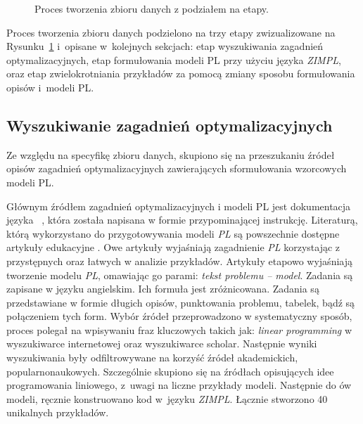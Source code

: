 \begin{figure}
\caption{Proces tworzenia zbioru danych z podziałem na etapy.}
\label{fig:dataset-creation-logical}
\end{figure}

Proces tworzenia zbioru danych podzielono na trzy etapy zwizualizowane na Rysunku~\ref{fig:dataset-creation-logical} i~opisane w~kolejnych sekcjach: etap wyszukiwania zagadnień optymalizacyjnych, etap formułowania modeli PL przy użyciu języka \textit{ZIMPL}, oraz etap zwielokrotniania przykładów za pomocą zmiany sposobu formułowania opisów i~modeli PL. 

\subsection{Wyszukiwanie zagadnień optymalizacyjnych}

Ze względu na specyfikę zbioru danych, skupiono się na przeszukaniu źródeł opisów zagadnień optymalizacyjnych zawierających sformułowania wzorcowych modeli PL.

Głównym źródłem zagadnień optymalizacyjnych i modeli PL jest dokumentacja języka  ~\cite{zimpl_manual}, która została napisana w formie przypominającej instrukcję. Literaturą, którą wykorzystano do przygotowywania modeli \textit{PL} są powszechnie dostępne artykuły edukacyjne \cite{brilliant_linear,byjus_linear,cimt,arsdcollege2020,libretexts_linear,superprof_linear,toppr_graphical}. Owe artykuły wyjaśniają zagadnienie \textit{PL} korzystając z przystępnych oraz łatwych w analizie przykładów. Artykuły etapowo wyjaśniają tworzenie modelu \textit{PL}, omawiając go parami: \textit{tekst problemu -- model}. Zadania są zapisane w języku angielskim. Ich formuła jest zróżnicowana. Zadania są przedstawiane w formie długich opisów, punktowania problemu, tabelek, bądź są połączeniem tych form.
Wybór źródeł przeprowadzono w systematyczny sposób, proces polegał na wpisywaniu fraz kluczowych takich jak: \textit{linear programming} w wyszukiwarce internetowej oraz wyszukiwarce scholar. Następnie wyniki wyszukiwania były odfiltrowywane na korzyść źródeł akademickich, popularnonaukowych. Szczególnie skupiono się na źródłach opisujących idee programowania liniowego, z~uwagi na liczne przykłady modeli. Następnie do ów modeli, ręcznie konstruowano kod w~języku \textit{ZIMPL}. 
Łącznie stworzono 40 unikalnych przykładów. 

